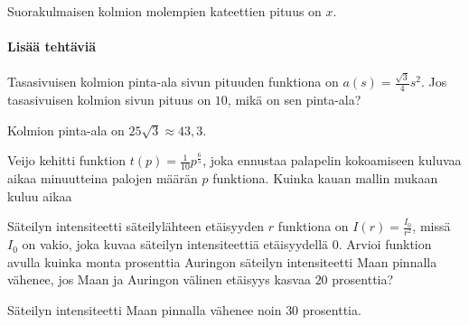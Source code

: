 \begin{tehtavasivu}
\begin{tehtava}
Suorakulmaisen kolmion molempien kateettien pituus on $x$.
\begin{alakohdat}
\end{alakohdat}
\begin{vastaus}
\begin{alakohdat}
\end{alakohdat}
\end{vastaus}
\end{tehtava}

\paragraph*{Lisää tehtäviä}

\begin{tehtava}
Tasasivuisen kolmion pinta-ala sivun pituuden funktiona on $a(s) = \frac{\sqrt{3}}{4}s^{2}$. Jos tasasivuisen kolmion sivun pituus on $10$, mikä on sen pinta-ala?
\begin{vastaus}
Kolmion pinta-ala on $25\sqrt{3}\approx43,3$.
\end{vastaus}
\end{tehtava}


\begin{tehtava}
Veijo kehitti funktion $t(p)=\frac{1}{10}p^{\frac{6}{5}}$, joka ennustaa palapelin kokoamiseen kuluvaa aikaa minuutteina palojen 
määrän $ p $ funktiona. Kuinka kauan mallin mukaan kuluu aikaa
\begin{alakohdat}
\end{alakohdat}
\begin{vastaus}
\begin{alakohdat}
\end{alakohdat}
\end{vastaus}
\end{tehtava}


\begin{tehtava}
Säteilyn intensiteetti säteilylähteen etäisyyden $r$ funktiona on $ I(r)=\frac{I_0}{r^{2}}$, missä $I_0$ on vakio, joka kuvaa säteilyn intensiteettiä etäisyydellä $0$. Arvioi funktion avulla kuinka monta prosenttia Auringon säteilyn intensiteetti Maan pinnalla vähenee, jos Maan ja Auringon välinen etäisyys kasvaa $20$ prosenttia?
\begin{vastaus}
Säteilyn intensiteetti Maan pinnalla vähenee noin $30$ prosenttia.
\end{vastaus}
\end{tehtava}


\end{tehtavasivu}
